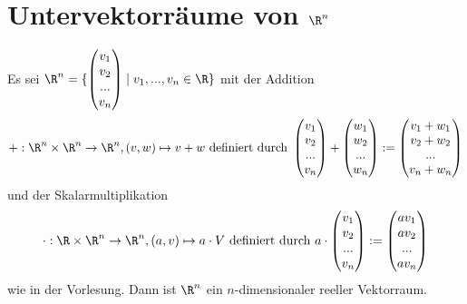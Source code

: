 \section{Untervektorräume von $\R^n$}
Es sei $\R^n=\{\begin{pmatrix} v_1 \\ v_2 \\ ... \\ v_n \end{pmatrix} \mid v_1,...,v_n \in \R \}$ mit der Addition
$$
+: \R^n \times \R^n \to \R^n, (v,w) \mapsto v+w \text{ definiert durch } \begin{pmatrix} v_1 \\ v_2 \\ ... \\ v_n \end{pmatrix}+\begin{pmatrix} w_1 \\ w_2 \\ ... \\ w_n \end{pmatrix}:=\begin{pmatrix} v_1+w_1 \\ v_2+w_2 \\ ... \\ v_n+w_n \end{pmatrix}
$$
und der Skalarmultiplikation
$$
\cdot : \R \times \R^n \to \R^n, (a,v) \mapsto a\cdot V \text{ definiert durch } a \cdot \begin{pmatrix} v_1 \\ v_2 \\ ... \\ v_n \end{pmatrix}:=\begin{pmatrix} a v_1 \\ a v_2 \\ ... \\ a v_n \end{pmatrix}
$$
wie in der Vorlesung. Dann ist $\R^n$ ein $n$-dimensionaler reeller Vektorraum.
\quad\\
